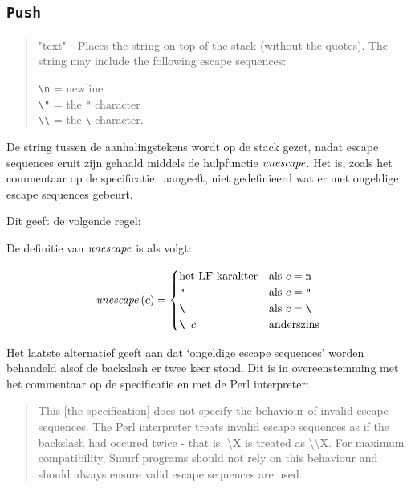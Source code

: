 \subsection{\texttt{Push}}
\label{sec:rules:push}

\begin{quote}
	"text" - Places the string on top of the stack (without the quotes). The
	string may include the following escape sequences:
	
	\verb$\n$ = newline \\
	\verb$\"$ = the \verb$"$ character \\
	\verb$\\$ = the \verb$\$ character.
\end{quote}

De string tussen de aanhalingstekens wordt op de stack gezet, nadat escape
sequences eruit zijn gehaald middels de hulpfunctie $\mathit{unescape}$. Het is,
zoals het commentaar op de specificatie~\cite{safalra} aangeeft, niet
gedefinieerd wat er met ongeldige escape sequences gebeurt.

Dit geeft de volgende regel:
\therpushns%

De definitie van $\mathit{unescape}$ is als volgt:

$$
	\mathit{unescape}\left(c\right) =
		\begin{cases}
			\text{het LF-karakter}      & \text{als $c=\texttt{n}$} \\
			\texttt{"}                  & \text{als $c=\texttt{"}$} \\
			\texttt{\textbackslash}     & \text{als $c=\texttt{\textbackslash}$} \\
			\texttt{\textbackslash~$c$} & \text{anderszins}
		\end{cases}
$$

Het laatste alternatief geeft aan dat `ongeldige escape sequences' worden
behandeld alsof de backslash er twee keer stond. Dit is in overeenstemming met
het commentaar op de specificatie en met de Perl interpreter: %
\begin{quote}
	This [the specification] does not specify the behaviour of invalid escape
	sequences. The Perl interpreter treats invalid escape sequences as if the
	backslash had occured twice - that is, \textbackslash X is treated as
	\textbackslash\textbackslash X. For maximum compatibility, Smurf programs
	should not rely on this behaviour and should always ensure valid escape
	sequences are used.
\end{quote}
